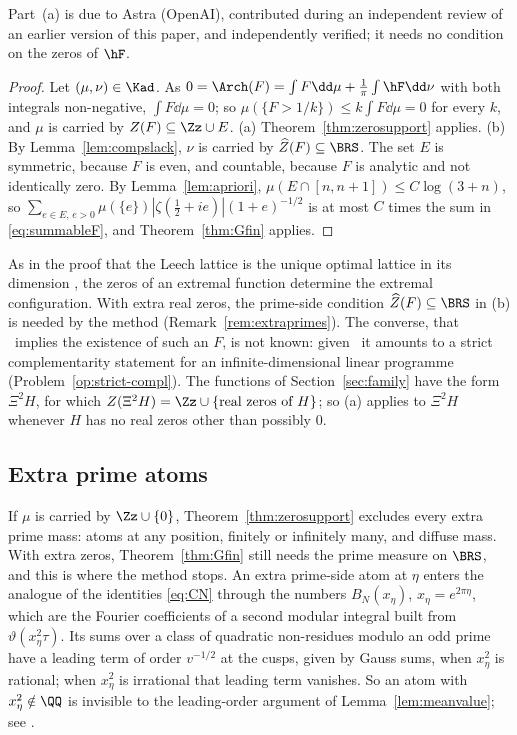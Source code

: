 Part~(a) is due to Astra (OpenAI), contributed during an independent review of an earlier version of this paper, and independently
verified; it needs no condition on the zeros of $\hF$.

\begin{proof}
Let $(\mu,\nu)\in\Kad$. As $0=\Arch(F)=\int F\dd\mu+\frac1\pi\int\hF\dd\nu$ with both integrals non-negative, $\int F\dd\mu=0$; so
$\mu(\{F>1/k\})\le k\int F\dd\mu=0$ for every $k$, and $\mu$ is carried by $Z(F)\subseteq\Zz\cup E$. (a) Theorem~\ref{thm:zerosupport} applies. (b) By
Lemma~\ref{lem:compslack}, $\nu$ is carried by $\widehat Z(F)\subseteq\BRS$. The set $E$ is symmetric, because $F$ is even, and countable,
because $F$ is analytic and not identically zero. By Lemma~\ref{lem:apriori}, $\mu(E\cap[n,n+1])\le C\log(3+n)$, so
$\sum_{e\in E,\,e>0}\mu(\{e\})|\zeta(\frac12+ie)|(1+e)^{-1/2}$ is at most $C$ times the sum in \eqref{eq:summableF}, and
Theorem~\ref{thm:Gfin} applies.
\end{proof}

As in the proof that the Leech lattice is the unique optimal lattice in its dimension \cite{CK09}, the zeros of an extremal function
determine the extremal configuration. With extra real zeros, the prime-side condition $\widehat Z(F)\subseteq\BRS$ in (b) is needed by the
method (Remark~\ref{rem:extraprimes}). The converse, that \condU\ implies the existence of such an $F$, is not known: given \condE\ it
amounts to a strict complementarity statement for an infinite-dimensional linear programme (Problem~\ref{op:strict-compl}). The functions of
Section~\ref{sec:family} have the form $\Xi^2H$, for which $Z(\Xi^2H)=\Zz\cup\{\text{real zeros of }H\}$; so (a) applies to $\Xi^2H$
whenever $H$ has no real zeros other than possibly $0$.

\subsection{Extra prime atoms}\label{ssec:extraprimes}

\begin{remark}\label{rem:extraprimes}
If $\mu$ is carried by $\Zz\cup\{0\}$, Theorem~\ref{thm:zerosupport} excludes every extra prime mass: atoms at any position, finitely or
infinitely many, and diffuse mass. With extra zeros, Theorem~\ref{thm:Gfin} still needs the prime measure on $\BRS$, and this is where the
method stops. An extra prime-side atom
at $\eta$ enters the analogue of the identities \eqref{eq:CN} through the numbers $B_N(x_\eta)$, $x_\eta=e^{2\pi\eta}$, which are the Fourier
coefficients of a second modular integral built from $\vartheta(x_\eta^2\tau)$. Its sums over a class of quadratic non-residues
modulo an odd prime have a leading term of order $v^{-1/2}$ at the cusps, given by Gauss sums, when $x_\eta^2$ is rational; when
$x_\eta^2$ is irrational that leading term vanishes. So an atom with $x_\eta^2\notin\QQ$ is invisible to the leading-order argument of
Lemma~\ref{lem:meanvalue}; see \cite{N2}.
\end{remark}

